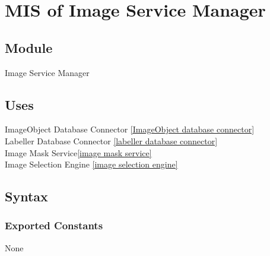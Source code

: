 \documentclass[12pt, titlepage]{article}
\begin{document}
   
  

\newpage


\section{MIS of Image Service Manager }\label{image service manager}
  
  
  
  \subsection{Module}
  
  Image Service Manager
  
  \subsection{Uses}
  
  ImageObject Database Connector \ref{ImageObject database connector}\\
  Labeller Database Connector \ref{labeller database connector}\\
  Image Mask Service\ref{image mask service}\\
  Image Selection Engine \ref{image selection engine}\\

  \subsection{Syntax}


  
  \subsubsection{Exported Constants}
  None
\end{document}
